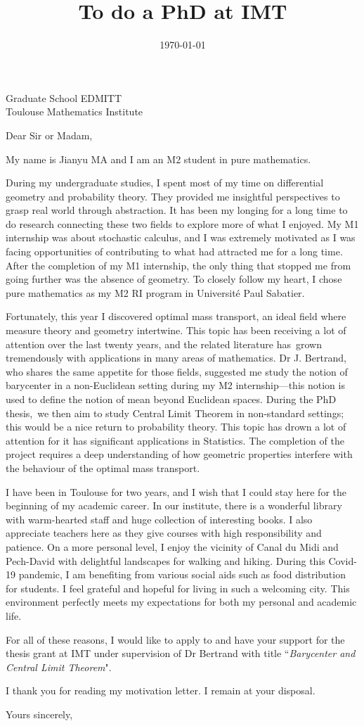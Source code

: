 \documentclass[11pt]{letter}
\title{To do a PhD at IMT}
\date{\today}
\begin{document}
\begin{letter}{Graduate School EDMITT \\Toulouse Mathematics Institute}
	\opening{Dear Sir or Madam,}

	\setlength\parindent{1em}
	My name is Jianyu MA and I am an M2 student in pure mathematics.

	During my undergraduate studies, I spent most of my time on differential geometry and probability theory.
	They provided me insightful perspectives to grasp real world through abstraction.
	It has been my longing for a long time to do research connecting these two fields to explore more of what I enjoyed. My M1 internship was about stochastic calculus, and I was extremely motivated as I was facing opportunities of contributing to what had attracted me for a long time.
	After the completion of my M1 internship, the only thing that stopped me from going further was the absence of geometry.
	To closely follow my heart, I chose pure mathematics as my M2 RI program in Université Paul Sabatier.

	Fortunately, this year I discovered optimal mass transport, an ideal field where measure theory and geometry intertwine.
	This topic has been receiving a lot of attention over the last twenty years, and the related literature has grown tremendously with applications in many areas of mathematics.
	Dr J. Bertrand, who shares the same appetite for those fields, suggested me study the notion of barycenter in a non-Euclidean setting during my M2 internship---this notion is used to define the notion of mean beyond Euclidean spaces.
	During the PhD thesis, we then aim to study Central Limit Theorem in non-standard settings; this would be a nice return to probability theory. This topic has drown a lot of attention for it has significant applications in Statistics. The completion of the project requires a deep understanding of how geometric properties interfere with the behaviour of the optimal mass transport.

	I have been in Toulouse for two years, and I wish that I could stay here for the beginning of my academic career.
	In our institute, there is a wonderful library with warm-hearted staff and huge collection of interesting books.
	I also appreciate teachers here as they give courses with high responsibility and patience.
	On a more personal level, I enjoy the vicinity of Canal du Midi and Pech-David with delightful landscapes for walking and hiking.
	During this Covid-19 pandemic, I am benefiting from various social aids such as food distribution for students.
	I feel grateful and hopeful for living in such a welcoming city.
	This environment perfectly meets my expectations for both my personal and academic life.

	For all of these reasons,  I would like to apply to and have your support for the thesis grant at IMT under supervision of Dr Bertrand with title ``\emph{Barycenter and Central Limit Theorem}".

	I thank you for reading my motivation letter.  I remain at your disposal.
	\closing{Yours sincerely,}
\end{letter}
\end{document}
